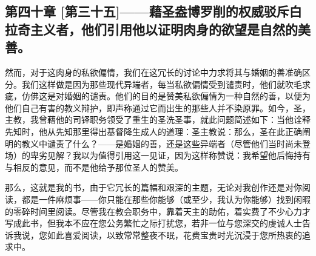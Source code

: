 
\subsection{第四十章 [第三十五]——藉圣盎博罗削的权威驳斥白拉奇主义者，他们引用他以证明肉身的欲望是自然的美善。}

然而，对于这肉身的私欲偏情，我们在这冗长的讨论中力求将其与婚姻的善准确区分。我们这样做是因为那些现代异端者，每当私欲偏情受到谴责时，他们就吹毛求疵，仿佛这是对婚姻的谴责。他们的目的是赞美私欲偏情为一种自然的善，以便为他们自己有害的教义辩护，即声称通过它而出生的那些人并不染原罪。如今，圣，主教，我曾藉他的司铎职务领受了重生的圣洗圣事，就此问题简述如下：当他诠释先知时，他从先知那里得出基督降生成人的道理：圣主教说：那么，圣在此正确阐明的教义中谴责了什么？——是婚姻的善，还是这些异端者（尽管他们当时尚未登场）的卑劣见解？我以为值得引用这一见证，因为这样称赞说：我希望他后悔持有与相反的意见，而不是他给予那位圣人的赞美。\par

那么，这就是我的书，由于它冗长的篇幅和艰深的主题，无论对我创作还是对你阅读，都是一件麻烦事——你只能在那些你能够（或至少，我认为你能够）找到闲暇的零碎时间里阅读。尽管我在教会职务中，靠着天主的助佑，着实费了不少心力才写成此书，但我本不应在您公务繁忙之际打扰您，若非一位与您深交的虔诚人士告诉我说，您如此喜爱阅读，以致常常整夜不眠，花费宝贵时光沉浸于您所热衷的追求中。\par



